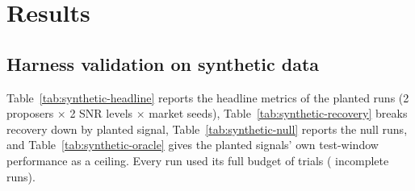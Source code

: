 \section{Results}
\label{sec:results}


\subsection{Harness validation on synthetic data}
\label{sec:results-synthetic}

\noindent{}
\medskip

Table~\ref{tab:synthetic-headline} reports the headline metrics of the
\SynRuns{} planted runs (2 proposers $\times$ 2 SNR levels $\times$
\SynSeeds{} market seeds), Table~\ref{tab:synthetic-recovery} breaks recovery
down by planted signal, Table~\ref{tab:synthetic-null} reports the
\SynNullRuns{} null runs, and Table~\ref{tab:synthetic-oracle} gives the
planted signals' own test-window performance as a ceiling. Every run used
its full budget of \SynBudget{} trials (\SynIncompleteRuns{} incomplete
runs).

\begin{table}[t]
\centering
\caption{Synthetic planted-alpha benchmark, planted markets (mean $\pm$ sd
across complete runs; \SynBudget{} trials per run). Recovery, recall and the
number selected average all runs; the remaining columns describe selected
factors and average only the runs that selected something, so a value
without $\pm$ comes from one run. Composite = equal-weight z-scored
combination of the selected factors on the \SynTestIcDates{}-date sealed
test window. Synthetic data only.}
\label{tab:synthetic-headline}
\resizebox{\textwidth}{!}{}
\end{table}

\begin{table}[t]
\centering
\caption{Recovery of each planted signal: runs in which a \emph{selected}
factor matched it on the test window ($\bar\rho\ge\SynRecoveryThreshold$),
and runs in which \emph{any evaluated trial} matched it on the formation
window ($|\bar\rho|\ge\SynRecoveryThreshold$; ``found'', i.e.\ recall, which
is about as frequent on the null markets). Synthetic data only.}
\label{tab:synthetic-recovery}
\resizebox{\textwidth}{!}{}
\end{table}

